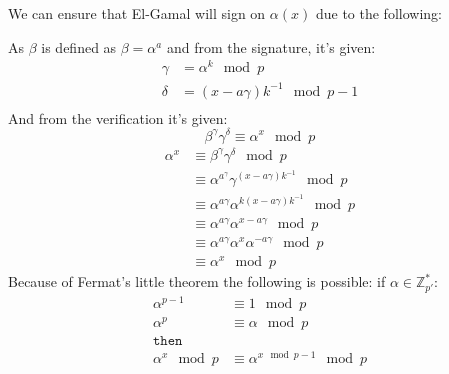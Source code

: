 



We can ensure that El-Gamal will sign on $\alpha(x)$ due to the
following:

As $\beta$ is defined as $\beta = \alpha^{a}$ and from the signature, it's given:
\begin{align*}
  \gamma &= \alpha^k \mod p \\
  \delta &= (x - a \gamma)k^{-1} \mod p - 1 \\
\end{align*}
And from the verification it's given:
\[ \beta^{\gamma}\gamma^{\delta} \equiv \alpha^x \mod p\]
\begin{align*}
  \alpha^x &\equiv \beta^{\gamma}\gamma^{\delta} \mod p\\
  &\equiv \alpha^{a^{\gamma}} \gamma^{(x-a\gamma)k^{-1}} \mod p\\
  &\equiv \alpha^{a\gamma} \alpha^{k(x-a\gamma)k^{-1}} \mod p\\
  &\equiv \alpha^{a\gamma} \alpha^{x-a\gamma} \mod p\\
  &\equiv \alpha^{a\gamma} \alpha^{x}\alpha^{-a\gamma} \mod p\\
  &\equiv \alpha^x \mod p
\end{align*}
Because of Fermat's little theorem the following is possible:
if $\alpha\in \mathbb{Z}_{p'}^*$:
\begin{align*}
  \alpha^{p-1} &\equiv 1 \mod p\\
  \alpha^p &\equiv \alpha \mod p\\
  \texttt{then}\\
  \alpha^x \mod p &\equiv \alpha^{x \mod p-1} \mod p
\end{align*}
